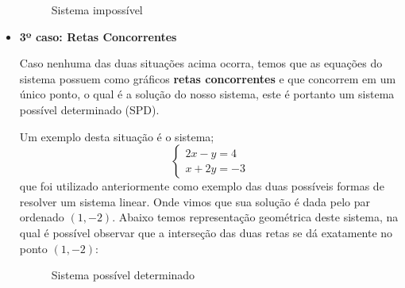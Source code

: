 \begin{itemize}
\begin{exem}
 \begin{figure}[H]
 \centering
    \caption{Sistema impossível}
  \end{figure}
 \end{exem}

 \item \textbf{3º caso: Retas Concorrentes}

 Caso nenhuma das duas situações acima ocorra, temos que as equações do sistema possuem como gráficos \textbf{retas concorrentes} e que concorrem em um único ponto, o qual é a solução do nosso sistema, este é portanto um {\color{red} sistema possível determinado (SPD)}.

 \begin{exem}
 Um exemplo desta situação é o sistema;
 \[\begin{cases}
    2x - y= 4 \\
    x + 2y= -3
   \end{cases}
\]
que foi utilizado anteriormente como exemplo das duas possíveis formas de resolver um sistema linear. Onde vimos que sua solução é dada pelo par ordenado $(1, -2)$. Abaixo temos representação geométrica deste sistema, na qual é possível observar que a interseção das duas retas se dá exatamente no ponto $(1, -2)$:

  \begin{figure}[H]
 \centering
    \caption{Sistema possível determinado}
  \end{figure}
 \end{exem}

 \end{itemize}

